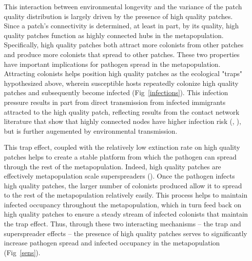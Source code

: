 \documentclass{svjour3}
\begin{document}
This interaction between environmental longevity and the variance of the patch quality distribution is largely driven by the presence of high quality patches.  Since a patch's connectivity is determined, at least in part, by its quality, high quality patches function as highly connected hubs in the metapopulation.  Specifically, high quality patches both attract more colonists from other patches and produce more colonists that spread to other patches.  These two properties have important implications for pathogen spread in the metapopulation. Attracting colonists helps position high quality patches as the ecological "traps" hypothesized above, wherein susceptible hosts repeatedly colonize high quality patches and subsequently become infected (Fig~\ref{infections}).  This infection pressure results in part from direct transmission from infected immigrants attracted to the high quality patch, reflecting results from the contact network literature that show that highly connected nodes have higher infection risk (\cite{Christley2005}, \cite{Keeling2005}), but is further augemented by environmental transmission.  

This trap effect, coupled with the relatively low extinction rate on high quality patches helps to create a stable platform from which the pathogen can spread through the rest of the metapopulation.  Indeed, high quality patches are effectively metapopulation scale superspreaders (\cite{Lloyd-Smith2005}).  Once the pathogen infects high quality patches, the larger number of colonists produced allow it to spread to the rest of the metapopulation relatively easily.  This process helps to maintain infected occupancy throughout the metapopulation, which in turn feed back on high quality patches to ensure a steady stream of infected colonists that maintain the trap effect.  Thus, through these two interacting mechanisms -- the trap and superspreader effects -- the presence of high quality patches serves to significantly increase pathogen spread and infected occupancy in the metapopulation (Fig~\ref{sens}).  
\end{document}

